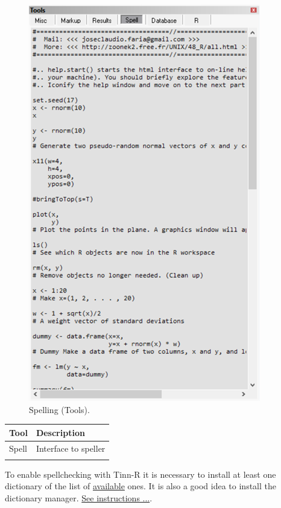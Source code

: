 \begin{figure}[H]
  \includegraphics[scale=0.6]{./res/tools_spell.png}
  \caption{Spelling (Tools).}
  \label{fig:tools_spell}
\end{figure}

\begin{footnotesize}
  \begin{tabularx}{\textwidth}{>{\hsize=0.3\hsize}X>{\hsize=0.7\hsize}X}\\
    \hline
    \textbf{Tool} & \textbf{Description} \\
    \hline
    Spell & Interface to speller \\
    \hline
    \\
  \end{tabularx}
\end{footnotesize}

To enable spellchecking with Tinn-R it is necessary to install at
least one dictionary of the list of
\href{http://www.luziusschneider.com/Speller/English/index.htm}{available} ones.
It is also a good idea to install the dictionary manager.
\href{\#configuration\_spellerinstalation}{See instructions ...}.


